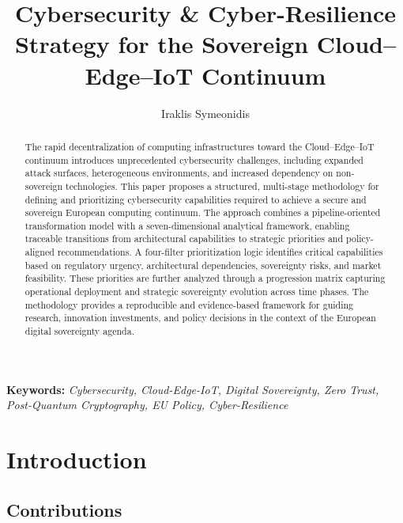 \documentclass{ieeeaccess}
\title{Cybersecurity \& Cyber-Resilience Strategy for the Sovereign Cloud--Edge--IoT Continuum}
\author{Iraklis Symeonidis}
\newenvironment{keywords}{\par\noindent\textbf{Keywords: }\itshape}{\par}
\begin{document}
\hypersetup{pageanchor=false}
\maketitle
\hypersetup{pageanchor=true}

\begin{abstract}
The rapid decentralization of computing infrastructures toward the Cloud--Edge--IoT continuum introduces unprecedented cybersecurity challenges, including expanded attack surfaces, heterogeneous environments, and increased dependency on non-sovereign technologies. This paper proposes a structured, multi-stage methodology for defining and prioritizing cybersecurity capabilities required to achieve a secure and sovereign European computing continuum. The approach combines a pipeline-oriented transformation model with a seven-dimensional analytical framework, enabling traceable transitions from architectural capabilities to strategic priorities and policy-aligned recommendations. A four-filter prioritization logic identifies critical capabilities based on regulatory urgency, architectural dependencies, sovereignty risks, and market feasibility. These priorities are further analyzed through a progression matrix capturing operational deployment and strategic sovereignty evolution across time phases. The methodology provides a reproducible and evidence-based framework for guiding research, innovation investments, and policy decisions in the context of the European digital sovereignty agenda.
\end{abstract}

\begin{keywords}
Cybersecurity, Cloud-Edge-IoT, Digital Sovereignty, Zero Trust, Post-Quantum Cryptography, EU Policy, Cyber-Resilience
\end{keywords}

\section{Introduction}

\subsection{Contributions}
\end{document}
